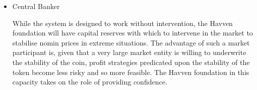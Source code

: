 \begin{itemize}
	

	\item{Central Banker}
	
	While the system is designed to work without intervention, the Havven foundation will have capital reserves with which to intervene
	in the market to stabilise nomin prices in extreme situations.
	The advantage of such a market participant is, given that a very large market entity is
	willing to underwrite the stability of the coin, profit strategies predicated upon the
	stability of the token become less risky and so more feasible. The Havven foundation in
	this capacity takes on the role of providing confidence.

\end{itemize}



\pagebreak